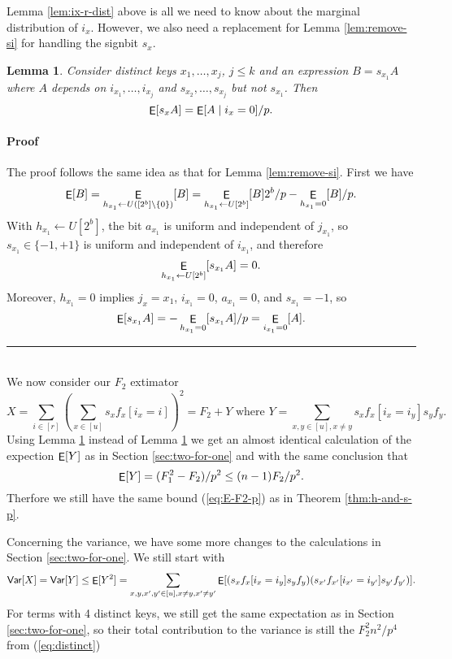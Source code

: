 \documentclass[12pt]{article}
\newcommand{\suchthat}{\mathrel{}\mathclose{}\ifnum\currentgrouptype=16\middle\fi\vert\mathopen{}\mathrel{}}
\DeclareMathOperator*{\E}{\sf{E}}
\newcommand{\Var}{{\sf Var}}
\newcommand{\req}[1]{(\ref{#1})}
\newtheorem {lemma} {Lemma}[section]
\newcommand{\qed}{\rule{1ex}{1ex}}
\newenvironment{proof}[1][]{\paragraph*{Proof{#1}}}{\hfill \qed\smallskip\\}
\begin{document}
Lemma \ref{lem:ix-r-dist} above is all we need to know about the
marginal distribution of $i_x$. However, we also need a replacement
for Lemma \ref{lem:remove-si} for handling the signbit $s_x$.
\begin{lemma}\label{lem:remove-si-r-dist} Consider distinct keys
$x_1,\ldots,x_j$, $j\leq k$ and an expression $B=s_{x_1}A$ where $A$
depends on $i_{x_1},\ldots,i_{x_j}$ and $s_{x_2},\ldots,s_{x_j}$ but not
$s_{x_1}$. 
Then
\begin{equation}\label{eq:remove-si-r-dist}
\E[s_xA]=\E[A\suchthat i_x=0]/p.
\end{equation}
\end{lemma}
\begin{proof}
The proof follows the same idea as that for Lemma \ref{lem:remove-si}.
First we have
\[\E[B]=\E_{h_{x_1}\gets U([2^b]\setminus\{0\})}[B]=\E_{h_{x_1}\gets U[2^b]}[B]2^b/p-\E_{h_{x_1}=0}[B]/p.\]
With $h_{x_1}\gets U[2^b]$, the bit $a_{x_1}$ is uniform and 
independent of $j_{x_1}$, so $s_{x_1}\in\{-1,+1\}$ is uniform and 
independent of $i_{x_1}$, and therefore 
\[\E_{h_{x_1}\gets U[2^b]}[s_{x_1}A]=0.\]
Moreover, $h_{x_1}=0$ implies $j_x={x_1}$, $i_{x_1}=0$, $a_{x_1}=0$,
and $s_{x_1}=-1$,
so 
\[\E[s_{x_1}A]=-\E_{h_{x_1}=0}[s_{x_1}A]/p=\E_{i_{x_1}=0}[A].\]
\end{proof}
We now consider our $F_2$ extimator
\[X=\sum_{i\in[r]}\left( \sum_{x\in[u]}s_x f_x[i_x=i]\right)^2\!
=F_2+Y\mbox{ where }Y=\sum_{x,y\in[u],x\neq y}
s_x f_x[i_x=i_y]s_y f_y.\]
Using Lemma \ref{lem:remove-si-r-dist} instead of Lemma
\ref{lem:remove-si-r-dist} we get an almost identical calculation 
of the expection $\E[Y]$ as
in Section \ref{sec:two-for-one} and with the same
conclusion that 
\begin{equation}\label{eq:E-Mersenne-arb-r}
\E[Y]=(F_1^2-F_2)/p^2\leq (n-1)F_2/p^2.
\end{equation}
Therfore we still have the same bound \req{eq:E-F2-p} as in Theorem \ref{thm:h-and-s-p}.

Concerning the variance, we have some more changes to the 
calculations in Section \ref{sec:two-for-one}.
We still start with
\[\Var[X]=\Var[Y]\leq \E[Y^2]=
\sum_{x,y,x',y'\in[u],x\neq y,x'\neq y'}\E[(s_x f_x[i_x=i_y]s_y f_y)
  (s_{x'}f_{x'}[i_{x'}=i_{y'}]s_{y'} f_{y'})].\] 
For terms with 4 distinct keys, we still get the same expectation
as in Section \ref{sec:two-for-one}, so their
total contribution to the variance is still the $F_2^2 n^2/p^4$ from
\req{eq:distinct}
\end{document}
